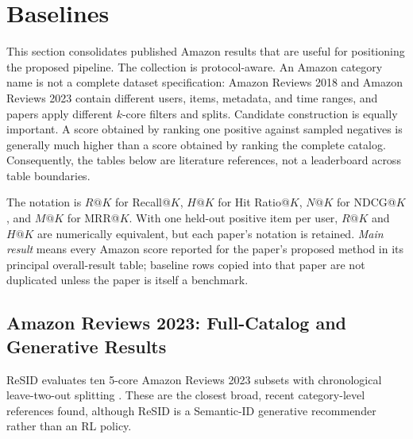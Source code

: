\section{Baselines}
\label{sec:baselines}

This section consolidates published Amazon results that are useful for
positioning the proposed pipeline. The collection is protocol-aware. An Amazon
category name is not a complete dataset specification: Amazon Reviews 2018 and
Amazon Reviews 2023 contain different users, items, metadata, and time ranges,
and papers apply different $k$-core filters and splits. Candidate construction
is equally important. A score obtained by ranking one positive against sampled
negatives is generally much higher than a score obtained by ranking the
complete catalog. Consequently, the tables below are literature references,
not a leaderboard across table boundaries.

The notation is $R@K$ for Recall@$K$, $H@K$ for Hit Ratio@$K$, $N@K$ for
NDCG@$K$, and $M@K$ for MRR@$K$. With one held-out positive item per user,
$R@K$ and $H@K$ are numerically equivalent, but each paper's notation is
retained. \emph{Main result} means every Amazon score reported for the paper's
proposed method in its principal overall-result table; baseline rows copied
into that paper are not duplicated unless the paper is itself a benchmark.

\subsection{Amazon Reviews 2023: Full-Catalog and Generative Results}

ReSID evaluates ten 5-core Amazon Reviews 2023 subsets with chronological
leave-two-out splitting \cite{RESID}. These are the closest broad, recent
category-level references found, although ReSID is a Semantic-ID generative
recommender rather than an RL policy.


